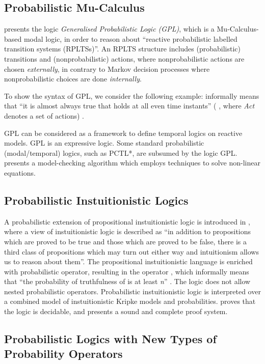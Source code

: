 \documentclass[11pt]{article}
\begin{document}
\subsection{Probabilistic Mu-Calculus}

\cite{CIN05} presents the logic \emph{Generalised Probabilistic Logic (GPL)}, which is a Mu-Calculus-based modal logic, in order to reason about ``reactive probabilistic labelled transition systems (RPLTSs)''. An RPLTS structure includes (probabilistic) transitions and (nonprobabilistic) actions, where nonprobabilistic actions are chosen \emph{externally}, in contrary to Markov decision processes where nonprobabilistic choices are done \emph{internally}. 

To show the syntax of GPL, we consider the following example:  informally means that ``it is almost always true that  holds at all even time instants'' (  , where \emph{Act} denotes a set of actions) \cite{CIN05}.

GPL can be considered as a framework to define temporal logics on reactive models. GPL is an expressive logic. Some standard probabilistic (modal/temporal) logics, such as PCTL*, are subsumed by the logic GPL. \cite{CIN05} presents a model-checking algorithm which employs techniques to solve non-linear equations.

\subsection{Probabilistic Instuitionistic Logics}

A probabilistic extension of propositional instuitionistic logic is introduced in \cite{MOR03}, where a view of instuitionistic logic is described as ``in addition to propositions which are proved to be true and those which are proved to be false, there is a third class of propositions which may turn out either way and intuitionism allows us to reason about them''. The propositional instuitionistic language is enriched with probabilistic operator, resulting in the operator , which informally means that  ``the probability of truthfulness of  is at least \textit{n}'' \cite{MOR03}. The logic does not allow nested probabilistic operators. Probabilistic instuitionistic logic is interpreted over a combined model of instuitionistic Kripke models and probabilities. \cite{MOR03} proves that the logic is decidable, and presents a sound and complete proof system. 

\subsection{Probabilistic Logics with New Types of Probability Operators}
\end{document}
